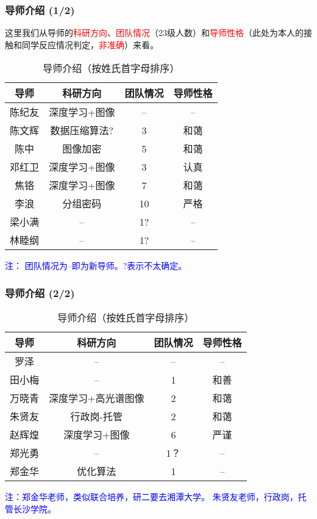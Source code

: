 \documentclass[slide]{../custom}
\begin{document}
\begin{frame}
  \frametitle{导师介绍 (1/2)}
  这里我们从导师的\textcolor{red}{科研方向}、\textcolor{red}{团队情况}（23级人数）和\textcolor{red}{导师性格}（此处为本人的接触和同学反应情况判定，\textcolor{red}{非准确}）来看。

  \begin{table}[htbp]
    \centering
    \caption{导师介绍（按姓氏首字母排序）}
    \begin{tabular}{cccc}
      \toprule
      导师 & 科研方向 & 团队情况 & 导师性格 \\
      \midrule
      陈纪友 & 深度学习+图像 & -- & -- \\
      陈文辉 & 数据压缩算法? & 3 & 和蔼 \\
      陈中 & 图像加密 & 5 & 和蔼 \\
      邓红卫 & 深度学习+图像 & 3 & 认真 \\
      焦铬 & 深度学习+图像 & 7 & 和蔼 \\
      李浪 & 分组密码 & 10 & 严格 \\
      梁小满 & -- & 1? & -- \\
      林睦纲 & -- & 1? & -- \\
      \bottomrule
    \end{tabular}
    \label{tab:导师介绍1}
  \end{table}
  \footnotesize{\textcolor{blue}{注： 团队情况为--即为新导师。?表示不太确定。}}
\end{frame}

\begin{frame}
  \frametitle{导师介绍 (2/2)}
  \begin{table}[htbp]
    \centering
    \caption{导师介绍（按姓氏首字母排序）}
    \begin{tabular}{cccc}
      \toprule
      导师 & 科研方向 & 团队情况 & 导师性格 \\
      \midrule
      罗泽 & -- & -- & -- \\
      田小梅 & -- & 1 & 和善 \\
      万晓青 & 深度学习+高光谱图像 & 2 & 和蔼 \\
      朱贤友 & 行政岗-托管 & 2 & 和蔼 \\
      赵辉煌 & 深度学习+图像 & 6 & 严谨 \\
      郑光勇 & -- & 1？ & -- \\
      郑金华 & 优化算法 & 1 & -- \\
      \bottomrule
    \end{tabular}
    \label{tab:导师介绍2}
  \end{table}
  \footnotesize{\textcolor{blue}{注：郑金华老师，类似联合培养，研二要去湘潭大学。 朱贤友老师，行政岗，托管长沙学院。}}
\end{frame}
\end{document}
